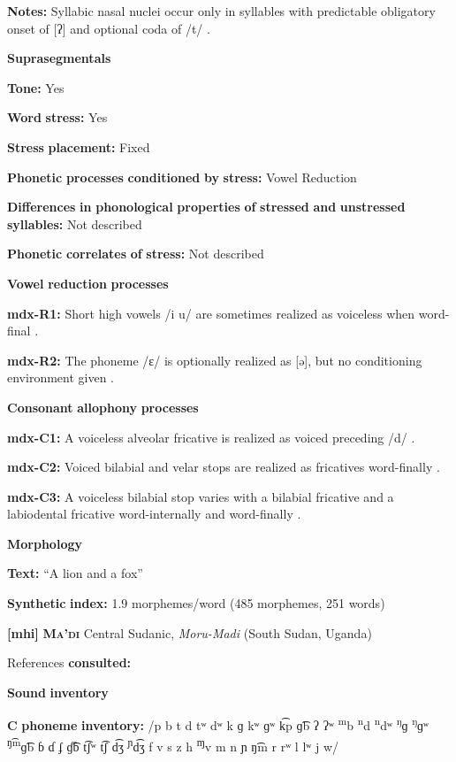 \textbf{Notes:} Syllabic nasal nuclei occur only in syllables with predictable obligatory onset of [ʔ] and optional coda of /t/ \citep[41]{Beachy2005}.

\textbf{Suprasegmentals}

\textbf{Tone:} Yes

\textbf{Word} \textbf{stress:} Yes

\textbf{Stress} \textbf{placement:} Fixed

\textbf{Phonetic} \textbf{processes} \textbf{conditioned} \textbf{by} \textbf{stress:} Vowel Reduction

\textbf{Differences} \textbf{in} \textbf{phonological} \textbf{properties} \textbf{of} \textbf{stressed} \textbf{and} \textbf{unstressed} \textbf{syllables:} Not described

\textbf{Phonetic} \textbf{correlates} \textbf{of} \textbf{stress:} Not described

\textbf{Vowel} \textbf{reduction} \textbf{processes}

\textbf{mdx-R1:} Short high vowels /i u/ are sometimes realized as voiceless when word-final \citep[35-6]{Beachy2005}.

\textbf{mdx-R2:} The phoneme /ɛ/ is optionally realized as [ə], but no conditioning environment given \citep[37]{Beachy2005}.

\textbf{Consonant} \textbf{allophony} \textbf{processes}

\textbf{mdx-C1:} A voiceless alveolar fricative is realized as voiced preceding /d/ \citep[26]{Beachy2005}.

\textbf{mdx-C2:} Voiced bilabial and velar stops are realized as fricatives word-finally \citep[17]{Beachy2005}.

\textbf{mdx-C3:} A voiceless bilabial stop varies with a bilabial fricative and a labiodental fricative word-internally and word-finally \citep[17]{Beachy2005}.

\textbf{Morphology}

\textbf{Text:} “A lion and a fox” \citep[154-158]{Beachy2005}

\textbf{Synthetic} \textbf{index:} 1.9 morphemes/word (485 morphemes, 251 words)

\textbf{[mhi]}   \textbf{\textsc{Ma’di}}  Central Sudanic, \textit{Moru-Madi} (South Sudan, Uganda)

References \textbf{consulted:} \citet{BlackingsFabb2003}

\textbf{Sound} \textbf{inventory}

\textbf{C} \textbf{phoneme} \textbf{inventory:} /p b t d tʷ dʷ k ɡ kʷ ɡʷ k͡p ɡ͡b ʔ ʔʷ \textsuperscript{m}b \textsuperscript{n}d \textsuperscript{n}dʷ \textsuperscript{ŋ}ɡ \textsuperscript{ŋ}ɡʷ \textsuperscript{ŋ͡m}ɡ͡b ɓ ɗ ʄ ɠ͡ɓ t͡ʃʷ t͡ʃ d͡ʒ \textsuperscript{ɲ}d͡ʒ f v s z h \textsuperscript{ɱ}v m n ɲ ŋ͡m r rʷ l lʷ j w/


